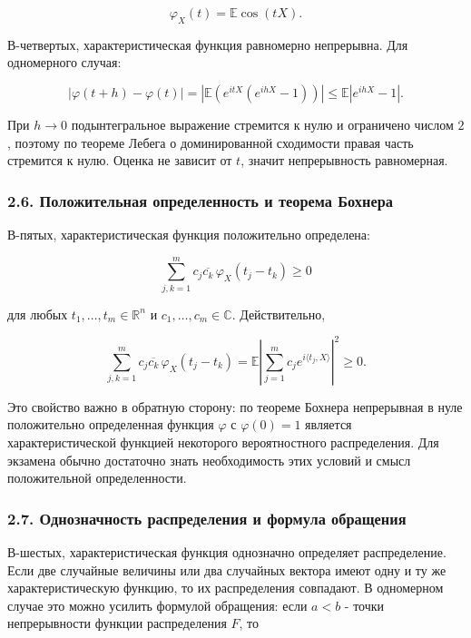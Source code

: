 \documentclass[
  11pt,
  a4paper,
]{article}
\begin{document}
\[
\varphi_X(t)=\mathbb E\cos(tX).
\]

В-четвертых, характеристическая функция равномерно непрерывна. Для
одномерного случая:

\[
|\varphi(t+h)-\varphi(t)|
=
\left|\mathbb E\left(e^{itX}(e^{ihX}-1)\right)\right|
\le
\mathbb E|e^{ihX}-1|.
\]

При \(h\to0\) подынтегральное выражение стремится к нулю и ограничено
числом \(2\), поэтому по теореме Лебега о доминированной сходимости
правая часть стремится к нулю. Оценка не зависит от \(t\), значит
непрерывность равномерная.

\subsubsection{2.6. Положительная определенность и теорема
Бохнера}\label{ux43fux43eux43bux43eux436ux438ux442ux435ux43bux44cux43dux430ux44f-ux43eux43fux440ux435ux434ux435ux43bux435ux43dux43dux43eux441ux442ux44c-ux438-ux442ux435ux43eux440ux435ux43cux430-ux431ux43eux445ux43dux435ux440ux430}

В-пятых, характеристическая функция положительно определена:

\[
\sum_{j,k=1}^m c_j\overline{c_k}\,
\varphi_X(t_j-t_k)\ge0
\]

для любых \(t_1,\ldots,t_m\in\mathbb R^n\) и
\(c_1,\ldots,c_m\in\mathbb C\). Действительно,

\[
\sum_{j,k=1}^m c_j\overline{c_k}\,
\varphi_X(t_j-t_k)
=
\mathbb E\left|\sum_{j=1}^m c_je^{i\langle t_j,X\rangle}\right|^2
\ge0.
\]

Это свойство важно в обратную сторону: по теореме Бохнера непрерывная в
нуле положительно определенная функция \(\varphi\) с \(\varphi(0)=1\)
является характеристической функцией некоторого вероятностного
распределения. Для экзамена обычно достаточно знать необходимость этих
условий и смысл положительной определенности.

\subsubsection{2.7. Однозначность распределения и формула
обращения}\label{ux43eux434ux43dux43eux437ux43dux430ux447ux43dux43eux441ux442ux44c-ux440ux430ux441ux43fux440ux435ux434ux435ux43bux435ux43dux438ux44f-ux438-ux444ux43eux440ux43cux443ux43bux430-ux43eux431ux440ux430ux449ux435ux43dux438ux44f}

В-шестых, характеристическая функция однозначно определяет
распределение. Если две случайные величины или два случайных вектора
имеют одну и ту же характеристическую функцию, то их распределения
совпадают. В одномерном случае это можно усилить формулой обращения:
если \(a<b\) - точки непрерывности функции распределения \(F\), то
\end{document}
